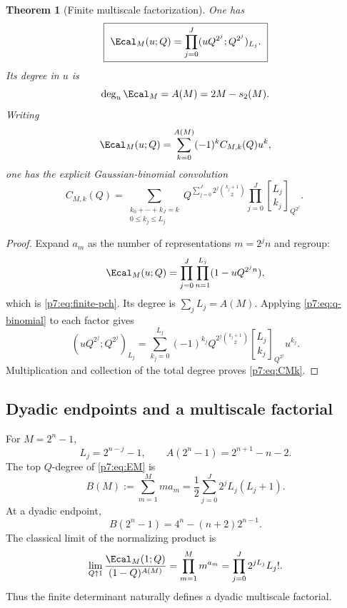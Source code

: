 \documentclass[11pt]{article}
\numberwithin{equation}{section}
\newtheorem{theorem}{Theorem}[section]
\theoremstyle{definition}
\theoremstyle{remark}
\newcommand{\qbinom}[3]{\genfrac{[}{]}{0pt}{}{#1}{#2}_{#3}}
\begin{document}
\begin{theorem}[Finite multiscale factorization]\label{p7:thm:finite-E}
One has
\begin{equation}\label{p7:eq:finite-pch}
 \boxed{\ \Ecal_M(u;Q)
 =\prod_{j=0}^{J}(uQ^{2^j};Q^{2^j})_{L_j}.\ }
\end{equation}
Its degree in $u$ is
\begin{equation}\label{p7:eq:EM-degree}
 \deg_u\Ecal_M=A(M)=2M-s_2(M).
\end{equation}
Writing
\begin{equation}\label{p7:eq:EM-coeff-def}
 \Ecal_M(u;Q)=\sum_{k=0}^{A(M)}(-1)^kC_{M,k}(Q)u^k,
\end{equation}
one has the explicit Gaussian-binomial convolution
\begin{equation}\label{p7:eq:CMk}
 \boxed{
 C_{M,k}(Q)=
 \sum_{\substack{k_0+\cdots+k_J=k\\0\le k_j\le L_j}}
 Q^{\sum_{j=0}^{J}2^j\binom{k_j+1}{2}}
 \prod_{j=0}^{J}\qbinom{L_j}{k_j}{Q^{2^j}}.\ }
\end{equation}
\end{theorem}

\begin{proof}
Expand $a_m$ as the number of representations $m=2^jn$ and regroup:
\[
 \Ecal_M(u;Q)
 =\prod_{j=0}^{J}\prod_{n=1}^{L_j}(1-uQ^{2^jn}),
\]
which is \cref{p7:eq:finite-pch}.  Its degree is $\sum_jL_j=A(M)$.  Applying \cref{p7:eq:q-binomial} to each factor gives
\[
 (uQ^{2^j};Q^{2^j})_{L_j}
 =\sum_{k_j=0}^{L_j}(-1)^{k_j}
 Q^{2^j\binom{k_j+1}{2}}
 \qbinom{L_j}{k_j}{Q^{2^j}}u^{k_j}.
\]
Multiplication and collection of the total degree proves \cref{p7:eq:CMk}.
\end{proof}

\subsection{Dyadic endpoints and a multiscale factorial}

For $M=2^n-1$,
\begin{equation}\label{p7:eq:dyadic-L}
 L_j=2^{n-j}-1,
 \qquad
 A(2^n-1)=2^{n+1}-n-2.
\end{equation}
The top $Q$-degree of \cref{p7:eq:EM} is
\begin{equation}\label{p7:eq:B-M}
 B(M):=\sum_{m=1}^{M}ma_m
 =\frac12\sum_{j=0}^{J}2^jL_j(L_j+1).
\end{equation}
At a dyadic endpoint,
\begin{equation}\label{p7:eq:B-dyadic}
 B(2^n-1)=4^n-(n+2)2^{n-1}.
\end{equation}
The classical limit of the normalizing product is
\begin{equation}\label{p7:eq:multiscale-factorial}
 \lim_{Q\uparrow1}\frac{\Ecal_M(1;Q)}{(1-Q)^{A(M)}}
 =\prod_{m=1}^{M}m^{a_m}
 =\prod_{j=0}^{J}2^{jL_j}L_j!.
\end{equation}
Thus the finite determinant naturally defines a dyadic multiscale factorial.
\end{document}
